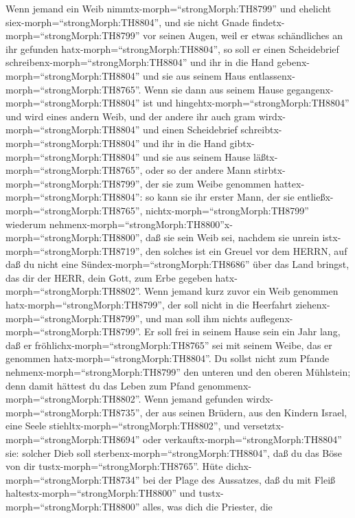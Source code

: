  Wenn jemand ein Weib nimmtx-morph=``strongMorph:TH8799''
und ehelicht siex-morph=``strongMorph:TH8804'', und sie nicht Gnade
findetx-morph=``strongMorph:TH8799'' vor seinen Augen, weil er etwas
schändliches an ihr gefunden hatx-morph=``strongMorph:TH8804'', so soll
er einen Scheidebrief schreibenx-morph=``strongMorph:TH8804'' und ihr in
die Hand gebenx-morph=``strongMorph:TH8804'' und sie aus seinem Haus
entlassenx-morph=``strongMorph:TH8765''.  Wenn sie dann aus
seinem Hause gegangenx-morph=``strongMorph:TH8804'' ist und
hingehtx-morph=``strongMorph:TH8804'' und wird eines andern Weib,
 und der andere ihr auch gram
wirdx-morph=``strongMorph:TH8804'' und einen Scheidebrief
schreibtx-morph=``strongMorph:TH8804'' und ihr in die Hand
gibtx-morph=``strongMorph:TH8804'' und sie aus seinem Hause
läßtx-morph=``strongMorph:TH8765'', oder so der andere Mann
stirbtx-morph=``strongMorph:TH8799'', der sie zum Weibe genommen
hattex-morph=``strongMorph:TH8804'':  so kann sie ihr erster
Mann, der sie entließx-morph=``strongMorph:TH8765'',
nichtx-morph=``strongMorph:TH8799'' wiederum
nehmenx-morph=``strongMorph:TH8800''x-morph=``strongMorph:TH8800'', daß
sie sein Weib sei, nachdem sie unrein istx-morph=``strongMorph:TH8719'',
den solches ist ein Greuel vor dem HERRN, auf daß du nicht eine
Sündex-morph=``strongMorph:TH8686'' über das Land bringst, das dir der
HERR, dein Gott, zum Erbe gegeben hatx-morph=``strongMorph:TH8802''.
 Wenn jemand kurz zuvor ein Weib genommen
hatx-morph=``strongMorph:TH8799'', der soll nicht in die Heerfahrt
ziehenx-morph=``strongMorph:TH8799'', und man soll ihm nichts
auflegenx-morph=``strongMorph:TH8799''. Er soll frei in seinem Hause
sein ein Jahr lang, daß er fröhlichx-morph=``strongMorph:TH8765'' sei
mit seinem Weibe, das er genommen hatx-morph=``strongMorph:TH8804''.
 Du sollst nicht zum Pfande
nehmenx-morph=``strongMorph:TH8799'' den unteren und den oberen
Mühlstein; denn damit hättest du das Leben zum Pfand
genommenx-morph=``strongMorph:TH8802''.  Wenn jemand
gefunden wirdx-morph=``strongMorph:TH8735'', der aus seinen Brüdern, aus
den Kindern Israel, eine Seele stiehltx-morph=``strongMorph:TH8802'',
und versetztx-morph=``strongMorph:TH8694'' oder
verkauftx-morph=``strongMorph:TH8804'' sie: solcher Dieb soll
sterbenx-morph=``strongMorph:TH8804'', daß du das Böse von dir
tustx-morph=``strongMorph:TH8765''.  Hüte
dichx-morph=``strongMorph:TH8734'' bei der Plage des Aussatzes, daß du
mit Fleiß haltestx-morph=``strongMorph:TH8800'' und
tustx-morph=``strongMorph:TH8800'' alles, was dich die Priester, die
